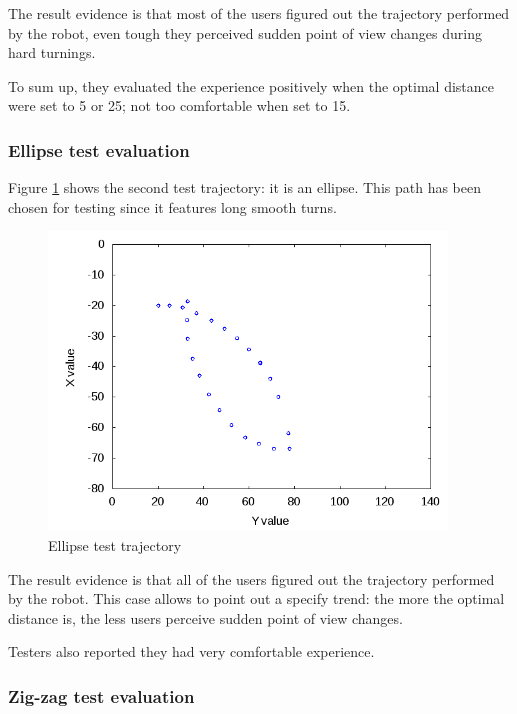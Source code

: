 
The result evidence is that most of the users figured out the
trajectory performed by the robot, even tough they perceived
sudden point of view changes during hard turnings.
%

%
To sum up, they evaluated the experience positively when the
optimal distance were set to 5 or 25; not too comfortable
when set to 15.


\subsubsection{Ellipse test evaluation}
\label{subsubsec:ellipsetest}

Figure \ref{fig:ellipsetest} shows the second test trajectory:
it is an ellipse. This path has been chosen for testing since it
features long smooth turns.

\begin{figure}[!h]
  \begin{center}
    \includegraphics[width=300pt]{img/path_session_5.png}
    \caption{Ellipse test trajectory}
    \label{fig:ellipsetest}
  \end{center}
\end{figure}
%


The result evidence is that all of the users figured out the
trajectory performed by the robot. This case allows to point out
a specify trend: the more the optimal distance is, the less users
perceive sudden point of view changes.
%

%
Testers also reported they had very comfortable experience.


\subsubsection{Zig-zag test evaluation}
\label{subsubsec:zigzagtest}

